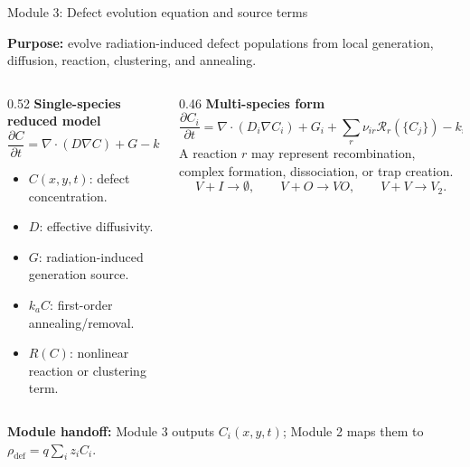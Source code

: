 \documentclass[aspectratio=169,9pt]{beamer}
\newcommand{\grad}{\nabla}
\newcommand{\divg}{\nabla\!\cdot}
\begin{document}
\begin{frame}{Module 3: Defect evolution equation and source terms}
\footnotesize
\vspace{-3mm}
\begin{bluebox}
\centering
\textbf{Purpose:} evolve radiation-induced defect populations from local generation, diffusion, reaction, clustering, and annealing.
\end{bluebox}

\vspace{1mm}
\begin{columns}[T,totalwidth=\textwidth]
\begin{column}{0.52\textwidth}
\textbf{Single-species reduced model}
\begin{equation*}
\boxed{\frac{\partial C}{\partial t}
=\divg(D\grad C)+G-k_a C-R(C)}
\end{equation*}
\begin{itemize}\setlength\itemsep{0.35mm}
\item \(C(x,y,t)\): defect concentration.
\item \(D\): effective diffusivity.
\item \(G\): radiation-induced generation source.
\item \(k_a C\): first-order annealing/removal.
\item \(R(C)\): nonlinear reaction or clustering term.
\end{itemize}
\end{column}
\begin{column}{0.46\textwidth}
\textbf{Multi-species form}
\begin{equation*}
\boxed{\frac{\partial C_i}{\partial t}
=\divg(D_i\grad C_i)+G_i+\sum_r \nu_{ir}\mathcal{R}_r(\{C_j\})-k_i C_i}
\end{equation*}
\small
A reaction \(r\) may represent recombination, complex formation, dissociation, or trap creation.
\begin{equation*}
V+I\rightarrow \emptyset,
\qquad
V+O\rightarrow VO,
\qquad
V+V\rightarrow V_2.
\end{equation*}
\end{column}
\end{columns}

\vspace{1mm}
\begin{greenbox}
\centering\scriptsize
\textbf{Module handoff:} Module 3 outputs \(C_i(x,y,t)\); Module 2 maps them to \(\rho_{\mathrm{def}}=q\sum_i z_iC_i\).
\end{greenbox}
\end{frame}
\end{document}
